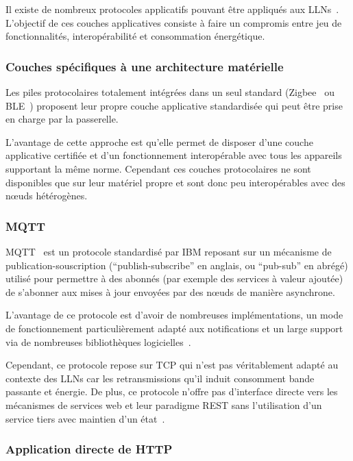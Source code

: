 Il existe de nombreux protocoles applicatifs pouvant être appliqués aux \ac{LLN}s~\cite{karagiannis2015survey}.
L'objectif de ces couches applicatives consiste à faire un compromis entre jeu de fonctionnalités, interopérabilité et consommation énergétique.

\subsubsection{Couches spécifiques à une architecture matérielle}

Les piles protocolaires totalement intégrées dans un seul standard (Zigbee~\cite{zigbeeCritic} ou \ac{BLE}~\cite{bleCritic}) proposent leur propre couche applicative standardisée qui peut être prise en charge par la passerelle.

L'avantage de cette approche est qu'elle permet de disposer d'une couche applicative certifiée et d'un fonctionnement interopérable avec tous les appareils supportant la même norme.
Cependant ces couches protocolaires ne sont disponibles que sur leur matériel propre et sont donc peu interopérables avec des nœuds hétérogènes.

\subsubsection{\ac{MQTT}}

\ac{MQTT}~\cite{hunkeler2008mqtt} est un protocole standardisé par IBM reposant sur un mécanisme de publication-souscription (``publish-subscribe'' en anglais, ou ``pub-sub'' en abrégé) utilisé pour permettre à des abonnés (par exemple des services à valeur ajoutée) de s'abonner aux mises à jour envoyées par des nœuds de manière asynchrone.

L'avantage de ce protocole est d'avoir de nombreuses implémentations, un mode de fonctionnement particulièrement adapté aux notifications et un large support via de nombreuses bibliothèques logicielles~\cite{stanford2008mqtt}.

Cependant, ce protocole repose sur \ac{TCP} qui n'est pas véritablement adapté au contexte des \ac{LLN}s car les retransmissions qu'il induit consomment bande passante et énergie.
De plus, ce protocole n'offre pas d'interface directe vers les mécanismes de services web et leur paradigme \ac{REST} sans l'utilisation d'un service tiers avec maintien d'un état~\cite{collina2012introducing}.

\subsubsection{Application directe de \ac{HTTP}}

